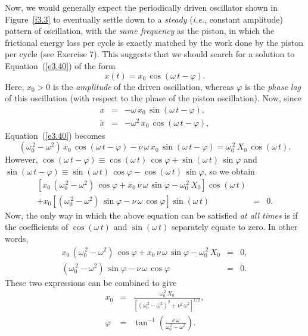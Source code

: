Now, we would generally expect the periodically driven oscillator shown in Figure~\ref{f3.3} to eventually settle down to
a {\em steady}\/ ({\em i.e.}, constant amplitude) pattern of oscillation, with the {\em same frequency}\/ as the piston, in which the frictional energy
loss per cycle is exactly matched by the work done  by the piston per cycle (see Exercise 7). This suggests
that we should search for a solution to Equation~(\ref{e3.40}) of the form
\begin{equation}
x(t)=x_0\,\cos(\omega\,t-\varphi).
\end{equation}
Here, $x_0>0$ is the {\em amplitude}\/ of the driven oscillation, whereas $\varphi$
is the {\em phase lag}\/ of this oscillation (with respect to the phase of the piston oscillation). 
Now, since
\begin{eqnarray}
\dot{x}& =& -\omega\,x_0\,\sin(\omega\,t-\varphi),\\[0.5ex]
\ddot{x} &=&-\omega^2\,x_0\,\cos(\omega\,t-\varphi),
\end{eqnarray}
Equation~(\ref{e3.40}) becomes
\begin{equation}
(\omega_0^{\,2}-\omega^2)\,x_0\,\cos(\omega\,t-\varphi) - \nu\,\omega\,x_0\,\sin(\omega\,t-\varphi)
 = \omega_0^{\,2}\,X_0\,\cos(\omega\,t).
 \end{equation}
However, $\cos(\omega\,t-\varphi)\equiv \cos(\omega\,t)\,\cos\varphi + \sin(\omega\,t)\,\sin\varphi$
and $\sin(\omega\,t-\varphi) \equiv \sin(\omega\,t)\,\cos \varphi - \cos(\omega\,t)\,\sin\varphi$, so
we obtain
\begin{eqnarray}
\left[x_0\,(\omega_0^{\,2}-\omega^2)\,\cos\varphi + x_0\,\nu\,\omega\,\sin\varphi -\omega_0^{\,2}\,X_0\right]\cos(\omega\,t)&&\nonumber\\[0.5ex]+x_0\left[(\omega_0^{\,2}-\omega^2)\,\sin\varphi-\nu\,\omega\,\cos\varphi\right]\sin(\omega\,t)&=&0.
\end{eqnarray}
Now, the only way in which the above equation can be satisfied {\em at all times}\/ is if
the coefficients of $\cos(\omega\,t)$ and $\sin(\omega\,t)$ separately equate to
zero. In other words,
\begin{eqnarray}
x_0\,(\omega_0^{\,2}-\omega^2)\,\cos\varphi + x_0\,\nu\,\omega\,\sin\varphi -\omega_0^{\,2}\,X_0&=&0,\label{e3.46}\\[0.5ex]
(\omega_0^{\,2}-\omega^2)\,\sin\varphi-\nu\,\omega\,\cos\varphi&=&0.\label{e3.47}
\end{eqnarray}
These two expressions can be combined to give
\begin{eqnarray}\label{e3.48}
x_0&=& \frac{\omega_0^{\,2}\,X_0}{\left[(\omega_0^{\,2}-\omega^2)^2+\nu^2\,\omega^2\right]^{1/2}},\\[0.5ex]
\varphi &=&\tan^{-1}\left(\frac{\nu\,\omega}{\omega_0^{\,2}-\omega^2}\right).\label{e3.49}
\end{eqnarray}
